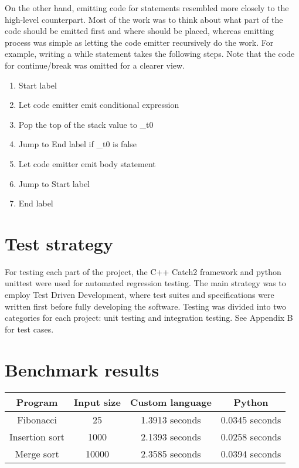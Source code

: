 \documentclass[manuscript,screen,nonacm]{acmart}
\begin{document}
On the other hand, emitting code for statements resembled more closely to the high-level counterpart. Most of the work was to think about what part of the code should be emitted first and where should be placed, whereas emitting process was simple as letting the code emitter recursively do the work. For example, writing a while statement takes the following steps. Note that the code for continue/break was omitted for a clearer view.
\begin{enumerate}
    \item Start label
    \item Let code emitter emit conditional expression
    \item Pop the top of the stack value to \_t0
    \item Jump to End label if \_t0 is false 
    \item Let code emitter emit body statement
    \item Jump to Start label
    \item End label 
\end{enumerate} 


\section{Test strategy}
For testing each part of the project, the C++ Catch2 framework and python unittest were used for automated regression testing. The main strategy was to employ Test Driven Development, where test suites and specifications were written first before fully developing the software\cite{OCW6.005}. Testing was divided into two categories for each project: unit testing and integration testing. See Appendix B for test cases.


\section{Benchmark results}

\begin{center}
\begin{tabular}{|c|c|c|c|}
    \hline
    Program & Input size & Custom language & Python \\
    \hline
    Fibonacci & 25 & 1.3913 seconds & 0.0345 seconds \\
    Insertion sort & 1000 & 2.1393 seconds & 0.0258 seconds \\
    Merge sort & 10000 & 2.3585 seconds & 0.0394 seconds \\
    \hline
\end{tabular}
\end{center}
\end{document}
